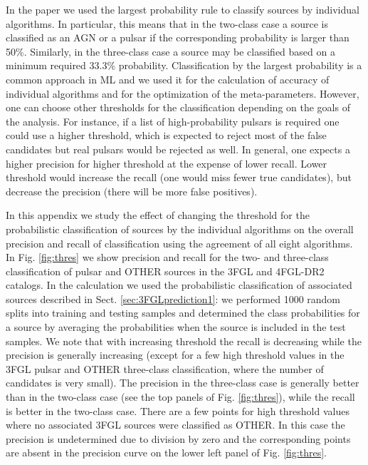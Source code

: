 \documentclass[referee]{aa} %
\begin{document}
\begin{appendix}
In the paper we used the largest probability rule to classify sources by individual algorithms.
In particular, this means that in the two-class case a source is classified as an AGN or a pulsar if the corresponding probability
is larger than 50\%. Similarly, in the three-class case a source may be classified based on a minimum required 33.3\% probability.
Classification by the largest probability is a common approach in ML and we used it
for the calculation of accuracy of individual algorithms and for the optimization of the meta-parameters. 
However, one can choose other thresholds for the classification depending on the goals of the analysis.
For instance, if a list of high-probability pulsars is required one could use a higher threshold, 
which is expected to reject most of the false candidates but real pulsars would be rejected as well. 
In general, one expects a higher precision for higher threshold
at the expense of lower recall.
Lower threshold would increase the recall (one would miss fewer true candidates), 
but decrease the precision (there will be more false positives).



In this appendix we study the effect of changing the threshold for the probabilistic classification of sources by the individual
algorithms on the overall precision and recall of classification using the agreement of all eight algorithms.
In Fig. \ref{fig:thres} we show precision and recall for the two- and three-class classification of pulsar and OTHER sources in the 3FGL and 4FGL-DR2 catalogs.
In the calculation we used the probabilistic classification of associated sources described in Sect. \ref{sec:3FGLprediction1}: we performed 1000 random splits into training and testing samples and determined the class probabilities for a source by averaging the probabilities when the source is included in the test samples.
We note that with increasing threshold the recall is decreasing while the precision is generally increasing  (except for a few high threshold values in the 3FGL pulsar and OTHER three-class classification, where the number of candidates is very small).
The precision in the three-class case is generally better than in the two-class case (see the top panels of Fig. \ref{fig:thres}),
while the recall is better in the two-class case.
There are a few points for high threshold values where no associated 3FGL sources were classified as OTHER.
In this case the precision is undetermined due to division by zero and the corresponding points are absent in the precision curve
on the lower left panel of Fig. \ref{fig:thres}.



\end{appendix}
\end{document}
